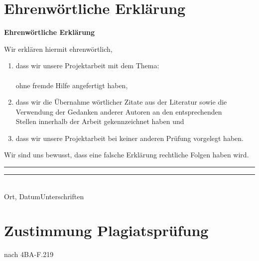 \cleardoublepage
\chapter{Ehrenwörtliche Erklärung}
    \vspace*{1cm}
    \begin{center}
        \huge\textbf{Ehrenwörtliche Erklärung}\\
    \end{center}
    \vspace*{1cm}
    \normalsize
    Wir erklären hiermit ehrenwörtlich,

    \begin{enumerate}
        \vspace{1cm}
        \item dass wir unsere Projektarbeit mit dem Thema:\\

        \textbf{\TextField[width=\columnwidth,multiline=true, height=2cm, name=Thema]{} }\\

        ohne fremde Hilfe angefertigt haben,
        \item dass wir die Übernahme wörtlicher Zitate aus der Literatur sowie die\\
        Verwendung der Gedanken anderer Autoren an den entsprechenden\\
        Stellen innerhalb der Arbeit gekennzeichnet haben und
        \item dass wir unsere Projektarbeit bei keiner anderen Prüfung vorgelegt haben.\\[1,5cm]
    \end{enumerate}
    Wir sind uns bewusst, dass eine falsche Erklärung rechtliche Folgen haben wird.\\[1,5cm]

   \rule{0.35\columnwidth}{0.4pt}\hspace{0.05\columnwidth}\rule{0.55\columnwidth}{0.4pt}\\
    Ort, Datum\hspace{0.27\columnwidth}Unterschriften


    \newpage
\chapter{Zustimmung Plagiatsprüfung}

    \vspace*{2mm}

    \begin{minipage}{0.5\columnwidth}
        
    \end{minipage}
    \begin{minipage}{0.45\columnwidth}
        \begin{flushright}
            {\small nach 4BA-F.219\\}
        \end{flushright}
    \end{minipage}
    \vspace*{2mm}

